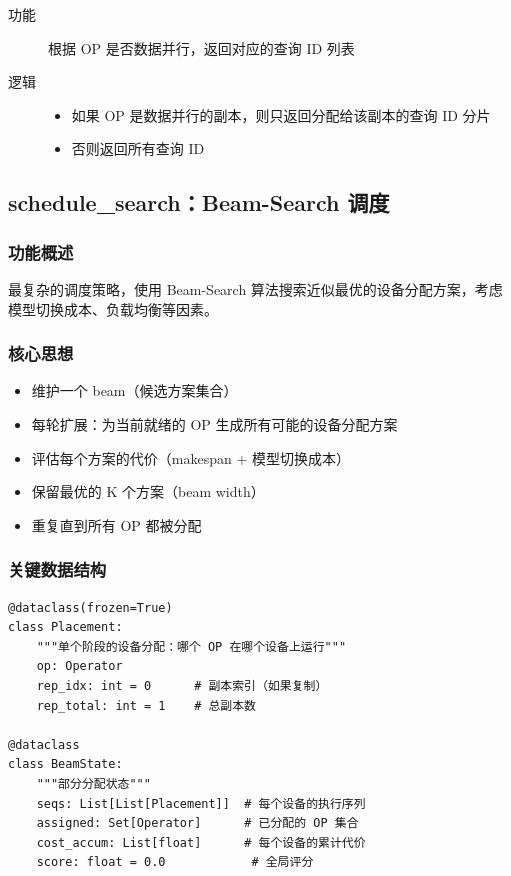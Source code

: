 \documentclass[12pt,a4paper]{article}
\begin{document}
\begin{description}
    \item[功能] 根据 OP 是否数据并行，返回对应的查询 ID 列表
    \item[逻辑]
    \begin{itemize}
        \item 如果 OP 是数据并行的副本，则只返回分配给该副本的查询 ID 分片
        \item 否则返回所有查询 ID
    \end{itemize}
\end{description}

\subsection{schedule\_search：Beam-Search 调度}

\subsubsection{功能概述}

最复杂的调度策略，使用 Beam-Search 算法搜索近似最优的设备分配方案，考虑模型切换成本、负载均衡等因素。

\subsubsection{核心思想}

\begin{itemize}
    \item 维护一个 beam（候选方案集合）
    \item 每轮扩展：为当前就绪的 OP 生成所有可能的设备分配方案
    \item 评估每个方案的代价（makespan + 模型切换成本）
    \item 保留最优的 K 个方案（beam width）
    \item 重复直到所有 OP 都被分配
\end{itemize}

\subsubsection{关键数据结构}

\begin{lstlisting}
@dataclass(frozen=True)
class Placement:
    """单个阶段的设备分配：哪个 OP 在哪个设备上运行"""
    op: Operator
    rep_idx: int = 0      # 副本索引（如果复制）
    rep_total: int = 1    # 总副本数

@dataclass
class BeamState:
    """部分分配状态"""
    seqs: List[List[Placement]]  # 每个设备的执行序列
    assigned: Set[Operator]      # 已分配的 OP 集合
    cost_accum: List[float]      # 每个设备的累计代价
    score: float = 0.0            # 全局评分
\end{lstlisting}
\end{document}
